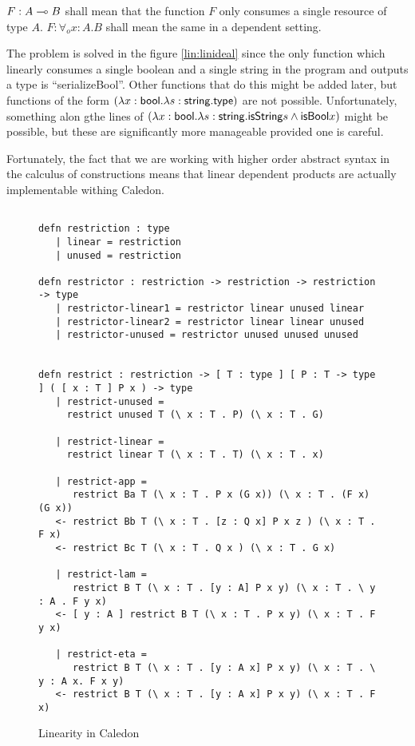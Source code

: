 $F : A \multimap B$ shall mean that the function $F$ only consumes a single resource of type $A$.  
$F : \forall_o x : A . B$ shall mean the same in a dependent setting.


The problem is solved in the figure \ref{lin:linideal} since the only function which linearly 
consumes a single boolean and a single string in the program and outputs a type is ``serializeBool''.  
Other functions that do this might be added later, but functions of the form 
$(\lambda x : \mathsf{bool}. \lambda s : \mathsf{string} . \mathsf{type})$ are not possible.  
Unfortunately, something alon gthe lines of 
$(\lambda x : \mathsf{bool}. \lambda s : \mathsf{string} . \mathsf{isString} s \wedge \mathsf{isBool} x)$ might be possible, 
but these are significantly more manageable provided one is careful.  

Fortunately, the fact that we are working with higher order abstract syntax in the calculus of constructions means that linear dependent products are actually implementable withing Caledon.


\begin{figure}[H]
\begin{lstlisting}

defn restriction : type
   | linear = restriction
   | unused = restriction

defn restrictor : restriction -> restriction -> restriction -> type
   | restrictor-linear1 = restrictor linear unused linear
   | restrictor-linear2 = restrictor linear linear unused 
   | restrictor-unused = restrictor unused unused unused


defn restrict : restriction -> [ T : type ] [ P : T -> type ] ( [ x : T ] P x ) -> type
   | restrict-unused = 
     restrict unused T (\ x : T . P) (\ x : T . G)

   | restrict-linear = 
     restrict linear T (\ x : T . T) (\ x : T . x)

   | restrict-app = 
      restrict Ba T (\ x : T . P x (G x)) (\ x : T . (F x) (G x))
   <- restrict Bb T (\ x : T . [z : Q x] P x z ) (\ x : T . F x)
   <- restrict Bc T (\ x : T . Q x ) (\ x : T . G x)

   | restrict-lam = 
      restrict B T (\ x : T . [y : A] P x y) (\ x : T . \ y : A . F y x)
   <- [ y : A ] restrict B T (\ x : T . P x y) (\ x : T . F y x)

   | restrict-eta = 
      restrict B T (\ x : T . [y : A x] P x y) (\ x : T . \ y : A x. F x y)
   <- restrict B T (\ x : T . [y : A x] P x y) (\ x : T . F x)

\end{lstlisting}
\caption{Linearity in Caledon}
\label{lin:linimp}
\end{figure}



